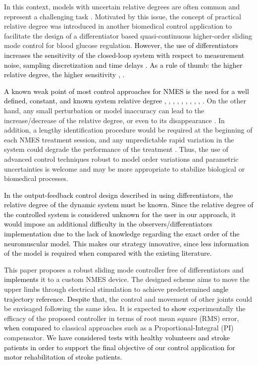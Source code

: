 \documentclass[review]{elsarticle}
\begin{document}
In this context, models with uncertain relative degrees are often common and represent a challenging task \cite{L:2012}. Motivated by this issue, the concept of practical relative degree was introduced in another biomedical control application \cite{HFLSLMA:2013} to facilitate the design of a differentiator based quasi-continuous higher-order sliding mode control for blood glucose regulation. \textcolor{black}{However, the use of differentiators increases the sensitivity of the closed-loop system with respect to measurement noise, sampling discretization and time delays \cite{L:2000}. As a rule of thumb: the higher relative degree, the higher sensitivity \cite{Lev:03}, \cite{OPH:2013}.}  


\textcolor{black}{A known weak point of most control approaches for NMES is the 
\textcolor{black}{need for a well defined, constant, and known system relative degree}  
\cite{JWK:2004}, \cite{SGD:2011}, \cite{KMQKY:2014}, \cite{MPFG:2012}, \cite{DTLZ:1999}, \cite{FHBC:2009}, \cite{PFSB:2005}, \cite{XCR:2014}, \cite{FE:2014}, \cite{NE:2012}.} On the other hand, any small perturbation or model inaccuracy can lead to the increase/decrease of the relative degree, or even to its disappearance \cite{L:2012}. In addition, a lengthy identification procedure would be required at the beginning of each NMES treatment session, and any unpredictable rapid variation in the system could degrade the performance of the treatment \cite{BFF:2015}. Thus, the use of advanced control techniques robust to model order variations and parametric uncertainties is welcome and may be more appropriate to stabilize biological or biomedical processes. 

\textcolor{black}{In the output-feedback control design described in \cite{L:2000} using differentiators, the relative degree of the dynamic system must be known. Since the relative degree of the controlled system is considered unknown for the user in our approach, it would impose an additional difficulty in the observers/differentiators implementation due to \textcolor{black}{the lack of knowledge regarding the exact order} of the neuromuscular model. This makes our strategy innovative, since less information of the model is required when compared with the existing literature.}

 




This paper proposes a robust sliding mode controller free of differentiators and \textcolor{black}{implements} it to a custom NMES device. The designed scheme aims to move the upper limbs through electrical stimulation to achieve predetermined \textcolor{black}{angle trajectory reference.} 
\textcolor{black}{Despite that,} the control and movement of other joints could be envisaged following the same idea. It is expected \textcolor{black}{to show} experimentally the efficacy of the proposed controller in terms of root mean square (RMS) error,
\textcolor{black}{when compared} to classical approaches such as \textcolor{black}{a} Proportional-Integral (PI) compensator.
\textcolor{black}{We have considered tests with healthy volunteers and stroke patients in order to support the final objective of our control application for motor rehabilitation of stroke patients.}
\end{document}
